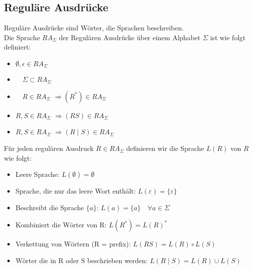 \subsection*{Reguläre Ausdrücke}

\begin{concept}{Reguläre Ausdrücke}
    sind Wörter, die Sprachen beschreiben.\\
    Die Sprache $R A_{\Sigma}$ der Regulären Ausdrücke über einem Alphabet $\Sigma$ ist wie folgt definiert:

    \begin{itemize}
    \item $\emptyset, \epsilon \in R A_{\Sigma}$
    \item $\quad \Sigma \subset R A_{\Sigma}$
    \item $\quad R \in R A_{\Sigma}$  $\Rightarrow\left(R^{*}\right) \in R A_{\Sigma}$
    \item $R, S \in R A_{\Sigma}$ $\Rightarrow(R S) \in R A_{\Sigma}$
    \item $R, S \in R A_{\Sigma}$ $\Rightarrow(R \mid S) \in R A_{\Sigma}$   
    \end{itemize}
\end{concept}

\begin{example}
    Für jeden regulären Ausdruck $R \in R A_{\Sigma}$ definieren wir die Sprache $L(R)$ von $R$ wie folgt:
    \begin{itemize}
        \item Leere Sprache: $L(\emptyset)=\emptyset$
        \item Sprache, die nur das leere Wort enthält: $L(\varepsilon)=\{\varepsilon\}$
        \item Beschreibt die Sprache $\{a\}$: $L(a)=\{a\} \quad \forall a \in \Sigma$
        \item Kombiniert die Wörter von R: $L(R^{*})=L(R)^{*}$
        \item Verkettung von Wörtern (R = prefix): $L(R S)=L(R) \circ L(S)$
        \item Wörter die in R oder S beschrieben werden: $L(R \mid S)=L(R) \cup L(S)$
    \end{itemize}
\end{example}

